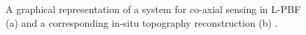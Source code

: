 \begin{figure}
    \centering
    \qquad
    \caption[Co-axial sensing and results.]{A graphical representation of a system for co-axial sensing in L-PBF \cite{leach_-machine_2020} (a) and a corresponding in-situ topography reconstruction (b) \cite{neef_low_2014}.}
\end{figure}

